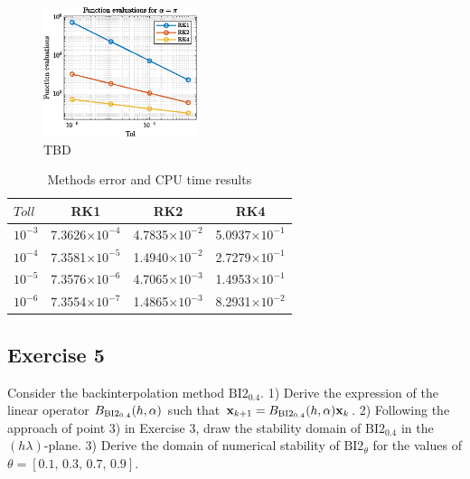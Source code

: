 \documentclass[11pt,a4paper,oneside]{article}
\renewcommand{\vec}[1]{\mathbf{#1}}
\begin{document}
\begin{figure}[htb]
    \centering
    \includegraphics*[width=0.4\textwidth, keepaspectratio]{ex4_feval.eps}
    \caption[]{\label{fig:ex4_feval} TBD}
\end{figure}

\begin{table}[ht]       
    \centering
        \begin{tabular}{lccc}
            \toprule
            \toprule
            $Toll$ & RK1& RK2& RK4\\ 
            \midrule
            $10^{-3}$& 7.3626$\times 10^{-4}$ & 4.7835$\times 10^{-2}$ & 5.0937$\times 10^{-1}$\\
            $10^{-4}$& 7.3581$\times 10^{-5}$ & 1.4940$\times 10^{-2}$ & 2.7279$\times 10^{-1}$\\
            $10^{-5}$& 7.3576$\times 10^{-6}$ & 4.7065$\times 10^{-3}$ & 1.4953$\times 10^{-1}$\\
            $10^{-6}$& 7.3554$\times 10^{-7}$ & 1.4865$\times 10^{-3}$ & 8.2931$\times 10^{-2}$\\
            \bottomrule
            \bottomrule
        \end{tabular}
    \caption{Methods error and CPU time results}
    \label{tab:ex4_resultCmp}
\end{table}



\clearpage
\subsection*{Exercise 5}
Consider the backinterpolation method $\textrm{BI2}_{0.4}$. 1) Derive the expression of the linear operator $B_{\rm BI2_{0.4}}(h,\alpha)$ such that $\vec x_{k+1} = B_{\rm BI2_{0.4}}(h,\alpha) \vec x_k$. 2) Following the approach of point 3) in Exercise 3, draw the stability domain of $\textrm{BI2}_{0.4}$ in the $(h\lambda)$-plane. 3) Derive the domain of numerical stability of $\textrm{BI2}_{\theta}$ for the values of $\theta = [0.1,\, 0.3,\, 0.7,\, 0.9]$.
\end{document}
